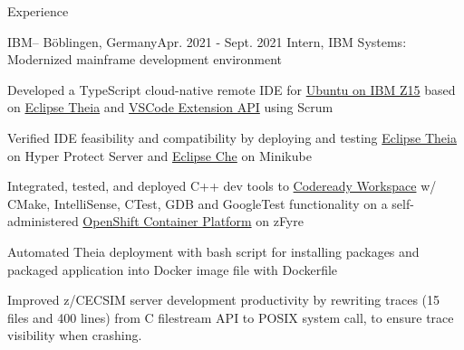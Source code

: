 \documentclass{resume} %
\begin{document}
\begin{rSection}{Experience}

\begin{rSubsection}{IBM}{--  Böblingen, Germany}{Apr. 2021 - Sept. 2021 }{Intern, IBM Systems: Modernized mainframe development environment}
\item Developed a TypeScript cloud-native remote IDE for \href{https://www.ibm.com/it-infrastructure/z/os/linux}{Ubuntu on IBM Z15}  based on \href{https://theia-ide.org/}{Eclipse Theia} and \href{https://code.visualstudio.com/api}{VSCode Extension API} using Scrum
\item Verified IDE feasibility and compatibility by deploying and testing  \href{https://theia-ide.org/}{Eclipse Theia} on Hyper Protect Server and \href{https://www.eclipse.org/che/} {Eclipse Che} on Minikube
\item Integrated, tested, and deployed C++ dev tools to  \href{https://www.redhat.com/en/technologies/jboss-middleware/codeready-workspaces}{Codeready Workspace}  w/ CMake, IntelliSense, CTest, GDB and GoogleTest functionality on a self-administered \href{https://www.redhat.com/en/technologies/cloud-computing/openshift/container-platform}{OpenShift Container Platform} on zFyre
\item Automated Theia deployment with bash script for installing packages and packaged application into Docker image file with Dockerfile
\item Improved z/CECSIM server development productivity by rewriting traces (15 files and 400 lines) from C filestream API to POSIX system call, to ensure trace visibility when crashing.
\end{rSubsection}


\end{rSection}
\end{document}
